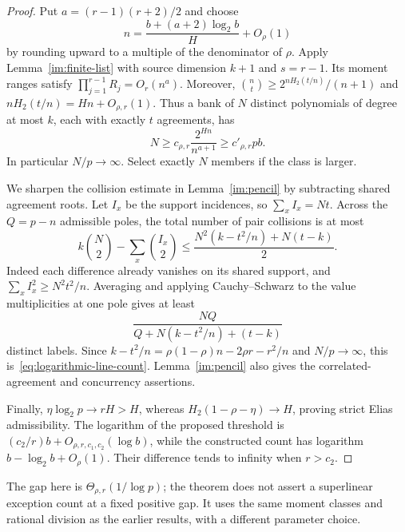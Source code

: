 \begin{proof}
Put $a=(r-1)(r+2)/2$ and choose
\[
 n=\frac{b+(a+2)\log_2b}{H}+O_\rho(1)
\]
by rounding upward to a multiple of the denominator of $\rho$.
Apply Lemma~\ref{im:finite-list} with source dimension $k+1$ and
$s=r-1$. Its moment ranges satisfy
$\prod_{j=1}^{r-1}R_j=O_r(n^a)$. Moreover,
$\binom nt\ge2^{nH_2(t/n)}/(n+1)$ and
$nH_2(t/n)=Hn+O_{\rho,r}(1)$. Thus a bank of $N$ distinct
polynomials of degree at most $k$, each with exactly $t$ agreements,
has
\[
 N\ge c_{\rho,r}\frac{2^{Hn}}{n^{a+1}}
   \ge c'_{\rho,r}p b.
\]
In particular $N/p\to\infty$. Select exactly $N$ members if the
class is larger.

We sharpen the collision estimate in Lemma~\ref{im:pencil} by
subtracting shared agreement roots. Let $I_x$ be the support
incidences, so $\sum_xI_x=Nt$. Across the $Q=p-n$ admissible poles,
the total number of pair collisions is at most
\[
 k\binom N2-\sum_x\binom{I_x}{2}
 \le\frac{N^2(k-t^2/n)+N(t-k)}2.
\]
Indeed each difference already vanishes on its shared support,
and $\sum_xI_x^2\ge N^2t^2/n$. Averaging and applying
Cauchy--Schwarz to the value multiplicities at one pole gives at least
\[
 \frac{NQ}{Q+N(k-t^2/n)+(t-k)}
\]
distinct labels. Since
$k-t^2/n=\rho(1-\rho)n-2\rho r-r^2/n$ and $N/p\to\infty$,
this is~\eqref{eq:logarithmic-line-count}.
Lemma~\ref{im:pencil} also gives the correlated-agreement and
concurrency assertions.

Finally, $\eta\log_2p\to rH>H$, whereas
$H_2(1-\rho-\eta)\to H$, proving strict Elias admissibility.
The logarithm of the proposed threshold is
$(c_2/r)b+O_{\rho,r,c_1,c_2}(\log b)$, while the constructed count
has logarithm $b-\log_2b+O_\rho(1)$. Their difference tends to
infinity when $r>c_2$.
\end{proof}

The gap here is $\Theta_{\rho,r}(1/\log p)$; the theorem does not
assert a superlinear exception count at a fixed positive gap.
It uses the same moment classes and rational division as the earlier
results, with a different parameter choice.

